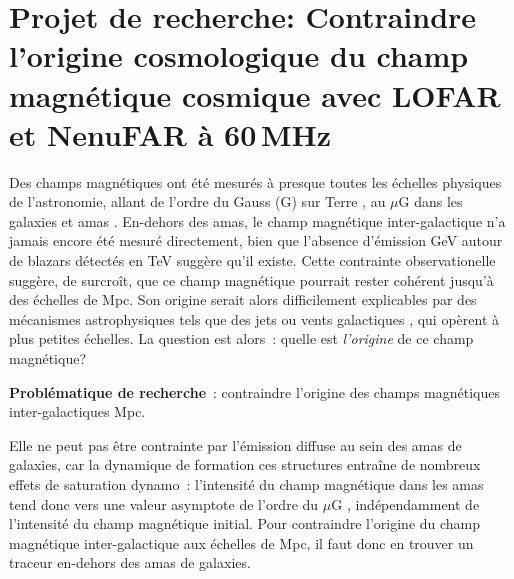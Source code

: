 



\section{Projet de recherche: Contraindre l'origine cosmologique du champ magn\'etique cosmique avec LOFAR et NenuFAR \`a 60\,MHz}






\pg
Des champs magn\'etiques ont \'et\'e mesur\'es \`a presque	 toutes les \'echelles physiques de l'astronomie, allant de l'ordre du Gauss (G) sur Terre \cite{2010SSRv..152..159H}, au $\mu$G dans les galaxies \citep{2013pss5.book..641B} et amas \citep{2019SSRv..215...16V}. En-dehors des amas, le champ magn\'etique inter-galactique n'a jamais encore \'et\'e mesur\'e directement, bien que l'absence d'\'emission GeV autour de blazars d\'etect\'es en TeV \cite{2010Sci...328...73N} sugg\`ere qu'il existe. Cette contrainte observationelle sugg\`ere, de surcro\^it, que ce champ magn\'etique pourrait rester coh\'erent jusqu'\`a des \'echelles de Mpc. Son origine serait alors difficilement explicables par des m\'ecanismes astrophysiques tels que des jets \citep{2001ApJ...556..619F} ou vents galactiques \citep{2006MNRAS.370..319B}, qui op\`erent \`a plus petites \'echelles. La question est alors~: quelle est \textit{l'origine} de ce champ magn\'etique?


\begin{tcolorbox}[colback=green!10, colframe=green!50!black, arc=3mm, boxrule=1pt]
	\textbf{Probl\'ematique de recherche}~: contraindre l'origine des champs magn\'etiques inter-galactiques Mpc. 
\end{tcolorbox}

Elle ne peut pas \^etre contrainte par l'\'emission diffuse au sein des amas de galaxies, car la dynamique de formation ces structures entra\^ine de nombreux effets de saturation dynamo~: l'intensit\'e du champ magn\'etique dans les amas tend donc vers une valeur asymptote de l'ordre du $\mu$G \citep{2013A&ARv..21...62D}, ind\'ependamment de l'intensit\'e du champ magn\'etique initial. Pour contraindre l'origine du champ magn\'etique inter-galactique aux \'echelles de Mpc, il faut donc en trouver un traceur en-dehors des amas de galaxies.

